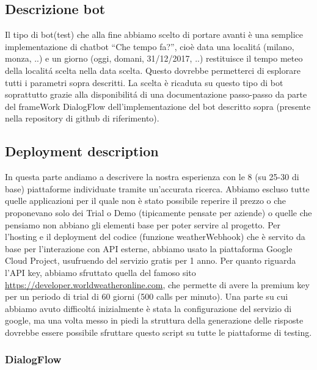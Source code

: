 \documentclass[]{article}
\begin{document}
\subsection{Descrizione bot}
Il tipo di bot(test) che alla fine abbiamo scelto di portare avanti è una semplice implementazione di chatbot “Che tempo fa?”, cioè data una localitá (milano, monza, ..) e un giorno (oggi, domani, 31/12/2017, ..) restituisce il tempo meteo della localitá scelta nella data scelta. Questo dovrebbe permetterci di esplorare tutti i parametri sopra descritti.
La scelta è ricaduta su questo tipo di bot soprattutto grazie alla disponibilitá di una documentazione passo-passo da parte del frameWork DialogFlow dell'implementazione del bot descritto sopra (presente nella repository di github di riferimento).

\subsection{Deployment description}
In questa parte andiamo a descrivere la nostra esperienza con le 8 (su 25-30 di base) piattaforme individuate tramite un'accurata ricerca. Abbiamo escluso tutte quelle applicazioni per il quale non è stato possibile reperire il prezzo o che proponevano solo dei Trial o Demo (tipicamente pensate per aziende) o quelle che pensiamo non abbiano gli elementi base per poter servire al progetto.
Per l’hosting e il deployment del codice (funzione weatherWebhook) che è servito da base per l’interazione con API esterne, abbiamo usato la piattaforma Google Cloud Project, usufruendo del servizio gratis per 1 anno. Per quanto riguarda l’API key, abbiamo sfruttato quella del famoso sito \url{https://developer.worldweatheronline.com}, che permette di avere la premium key per un periodo di trial di 60 giorni (500 calls per minuto). Una parte su cui abbiamo avuto difficoltá inizialmente è stata la configurazione del servizio di google, ma una volta messo in piedi la struttura della generazione delle risposte dovrebbe essere possibile sfruttare questo script su tutte le piattaforme di testing.

\subsubsection{DialogFlow} 
\end{document}
